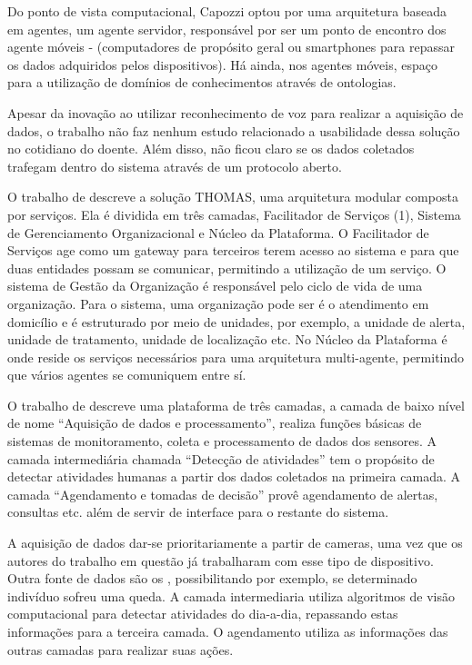 Do ponto de vista computacional, Capozzi optou por uma arquitetura baseada em
agentes, um agente servidor, responsável por ser um ponto de encontro dos
agente móveis - (computadores de propósito geral ou smartphones para repassar
os dados adquiridos pelos dispositivos). Há ainda, nos agentes móveis, espaço
para a utilização de domínios de conhecimentos através de ontologias.
 
Apesar da inovação ao utilizar reconhecimento de voz para realizar a aquisição
de dados, o trabalho não faz nenhum estudo relacionado a usabilidade dessa
solução no cotidiano do doente. Além disso, não ficou claro se os dados
coletados trafegam dentro do sistema através de um protocolo aberto.

O trabalho de  descreve a solução THOMAS, uma
arquitetura modular composta por serviços. Ela é dividida em três camadas,
Facilitador de Serviços (1), Sistema de Gerenciamento Organizacional e Núcleo
da Plataforma. O Facilitador de Serviços age como um gateway para terceiros
terem acesso ao sistema e para que duas entidades possam se comunicar,
permitindo a utilização de um serviço. O sistema de Gestão da Organização é
responsável pelo ciclo de vida de uma organização. Para o sistema, uma
organização pode ser é o atendimento em domicílio e é estruturado por meio de
unidades, por exemplo, a unidade de alerta, unidade de tratamento, unidade de
localização  etc. No Núcleo da Plataforma é onde reside os serviços necessários
para uma arquitetura multi-agente, permitindo que vários agentes se comuniquem
entre sí.

O trabalho de  descreve uma plataforma de três
camadas, a camada de baixo nível de nome ``Aquisição de dados e processamento'',
realiza funções básicas de sistemas de monitoramento, coleta e processamento de
dados dos sensores. A camada intermediária chamada ``Detecção de atividades'' tem
o propósito de detectar atividades humanas a partir dos dados coletados na
primeira camada. A camada ``Agendamento e tomadas de decisão'' provê agendamento
de alertas, consultas etc.  além de servir de interface para o restante do
sistema.

A aquisição de dados dar-se prioritariamente a partir de cameras, uma vez que
os autores do trabalho em questão já trabalharam com esse tipo de dispositivo.
Outra fonte de dados são os \smartphones, possibilitando por exemplo, se
determinado indivíduo sofreu uma queda. A camada intermediaria utiliza
algoritmos de visão computacional para detectar atividades do dia-a-dia,
repassando estas informações para a terceira camada. O agendamento utiliza as
informações das outras camadas para realizar suas ações. 

